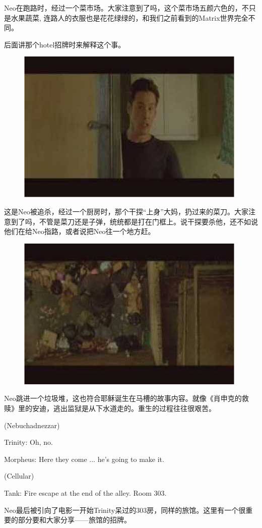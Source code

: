 \documentclass{ctexart}
\newenvironment{myquote}{\color{green} \setlength{\leftskip}{6em} \setlength{\rightskip}{4em} \setlength{\parindent}{-2em}}{\par}
\begin{document}
Neo在跑路时，经过一个菜市场。大家注意到了吗，这个菜市场五颜六色的，不只是水果蔬菜, 连路人的衣服也是花花绿绿的，和我们之前看到的Matrix世界完全不同。

后面讲那个hotel招牌时来解释这个事。

\begin{figure}[htb]
\centering
\includegraphics[width=0.5\linewidth]{fig/read_Matrix-79}
\end{figure}

这是Neo被追杀，经过一个厨房时，那个干探“上身”大妈，扔过来的菜刀。大家注意到了吗，不管是菜刀还是子弹，统统都是打在门框上。说干探要杀他，还不如说他们在给Neo指路，或者说把Neo往一个地方赶。

\begin{figure}[htb]
\centering
\includegraphics[width=0.5\linewidth]{fig/read_Matrix-80}
\end{figure}

Neo跳进一个垃圾堆，这也符合耶稣诞生在马槽的故事内容。就像《肖申克的救赎》里的安迪，逃出监狱是从下水道走的。重生的过程往往很艰苦。

\begin{myquote}
(Nebuchadnezzar)

Trinity: Oh, no.

Morpheus: Here they come ... he's going to make it.

(Cellular)

Tank: Fire escape at the end of the alley. Room 303.
\end{myquote}

Neo最后被引向了电影一开始Trinity呆过的303房，同样的旅馆。这里有一个很重要的部分要和大家分享——旅馆的招牌。
\end{document}
